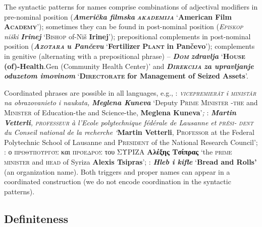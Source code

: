 \documentclass[output=paper]{langsci/langscibook}
\newcommand{\trigger}[1]{\textsc{#1}}
\begin{document}
{The syntactic patterns for  names comprise combinations of
adjectival modifiers in pre-nominal position (\textbf{\textit{Američka
filmska }}\textbf{\textit{\trigger{akademija}}} ‘\textbf{American Film
}\textbf{\trigger{Academy}}’); sometimes they can be found in post-nominal position
(\textit{\trigger{Episkop}} \textit{niški }\textbf{\textit{Irinej}}
‘\trigger{Bishop} of-Niš \textbf{Irinej}’); prepositional complements in
post-nominal position (\textbf{\textit{\trigger{Azotara}}}
\textbf{\textit{u Pančevu}} ‘\textbf{Fertilizer }\textbf{\trigger{Plant}}
\textbf{in Pančevo}’); complements in genitive (alternating with a
prepositional phrase) – \textbf{\textit{\trigger{Dom}}}
\textbf{\textit{zdravlja}} ‘\textbf{\trigger{House}}
\textbf{(of)-Health}.Gen (Community Health Center)’ and
\textbf{\textit{\trigger{Direkcija}}} \textbf{\textit{za upravljanje
oduzetom imovinom}} ‘\textbf{\trigger{Directorate}} \textbf{for
Management of Seized Assets}’.



Coordinated phrases are possible in all languages, e.g., :
\textit{\trigger{vicepremierăt}} \textit{i }\textit{\trigger{ministăr}}
\textit{na obrazovanieto i naukata, }\textbf{\textit{Meglena Kuneva
}}‘Deputy \trigger{Prime Minister} \trigger{-the} and \trigger{Minister} of
Education-the and Science-the, \textbf{Meglena Kuneva}’\textit{; }:
\textbf{\textit{Martin Vetterli}}\textit{, }\textit{\trigger{professeur}}
\textit{à l'Ecole polytechnique fédérale de Lausanne et} \textit{\trigger{prési-}} \textit{\trigger{dent}} \textit{du Conseil national de la recherche
‘}\textbf{Martin Vetterli}, \trigger{Professor} at the Federal
Polytechnic School of Lausanne and \trigger{President} of the National
Research Council’; : ο \trigger{πρωθυπουργός}
και \trigger{πρόεδρος} του ΣΥΡΙΖΑ
\textbf{Αλέξης Τσίπρας} ‘the \trigger{prime minister} and
\trigger{head} of Syriza \textbf{Alexis Tsipras}’; :\textit{
}\textbf{\textit{Hleb i kifle}} ‘\textbf{Bread and Rolls’ }(an
organization name). Both triggers and proper names can appear in a
coordinated construction (we do not encode coordination in the
syntactic patterns).



\subsection{Definiteness} %

}
\end{document}

